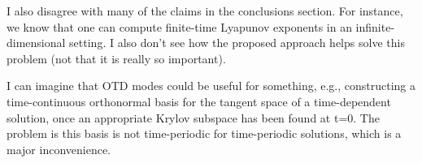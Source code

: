 \begin{description}
I also disagree with many of the claims in the conclusions section. For instance, we know that one can compute finite-time Lyapunov exponents in an infinite-dimensional setting. I also don't see how the proposed approach helps solve this problem (not that it is really so important).

I can imagine that OTD modes could be useful for something, e.g., constructing a time-continuous orthonormal basis for the tangent space of a time-dependent solution, once an appropriate Krylov subspace has been found at t=0. The problem is this basis is not time-periodic for time-periodic solutions, which is a major inconvenience.



\end{description}
